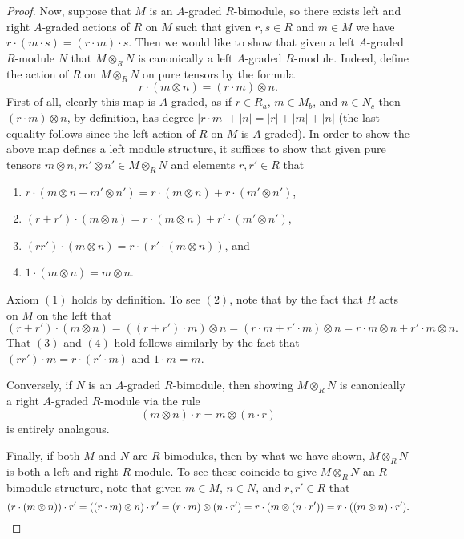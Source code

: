 \documentclass[../main.tex]{subfiles}
\begin{document}
\begin{proof}
	Now, suppose that $M$ is an $A$-graded $R$-bimodule, so there exists left and right $A$-graded actions of $R$ on $M$ such that given $r,s\in R$ and $m\in M$ we have $r\cdot(m\cdot s)=(r\cdot m)\cdot s$. Then we would like to show that given a left $A$-graded $R$-module $N$ that $M\otimes_RN$ is canonically a left $A$-graded $R$-module. Indeed, define the action of $R$ on $M\otimes_RN$ on pure tensors by the formula
	\[r\cdot(m\otimes n)=(r\cdot m)\otimes n.\]
	First of all, clearly this map is $A$-graded, as if $r\in R_a$, $m\in M_b$, and $n\in N_c$ then $(r\cdot m)\otimes n$, by definition, has degree $|r\cdot m|+|n|=|r|+|m|+|n|$ (the last equality follows since the left action of $R$ on $M$ is $A$-graded). In order to show the above map defines a left module structure, it suffices to show that given pure tensors $m\otimes n,m'\otimes n'\in M\otimes_RN$ and elements $r,r'\in R$ that
	\begin{enumerate}
		\item $r\cdot(m\otimes n+m'\otimes n')=r\cdot(m\otimes n)+r\cdot( m'\otimes n')$,
		\item $(r+r')\cdot(m\otimes n)=r\cdot(m\otimes n)+r'\cdot(m'\otimes n')$,
		\item $(rr')\cdot(m\otimes n)=r\cdot(r'\cdot(m\otimes n))$, and
		\item $1\cdot (m\otimes n)=m\otimes n$.
	\end{enumerate}
	Axiom $(1)$ holds by definition. To see $(2)$, note that by the fact that $R$ acts on $M$ on the left that
	\[(r+r')\cdot(m\otimes n)=((r+r')\cdot m)\otimes n=(r\cdot m+r'\cdot m)\otimes n=r\cdot m\otimes n+r'\cdot m\otimes n.\]
	That $(3)$ and $(4)$ hold follows similarly by the fact that $(rr')\cdot m=r\cdot(r'\cdot m)$ and $1\cdot m=m$.

	Conversely, if $N$ is an $A$-graded $R$-bimodule, then showing $M\otimes_RN$ is canonically a right $A$-graded $R$-module via the rule
	\[(m\otimes n)\cdot r=m\otimes(n\cdot r)\]
	is entirely analagous.

	Finally, if both $M$ and $N$ are $R$-bimodules, then by what we have shown, $M\otimes_RN$ is both a left and right $R$-module. To see these coincide to give $M\otimes_RN$ an $R$-bimodule structure, note that given $m\in M$, $n\in N$, and $r,r'\in R$ that
	\[(r\cdot(m\otimes n))\cdot r'=((r\cdot m)\otimes n)\cdot r'=(r\cdot m)\otimes(n\cdot r')=r\cdot(m\otimes(n\cdot r'))=r\cdot((m\otimes n)\cdot r').\qedhere\]
\end{proof}
\end{document}
